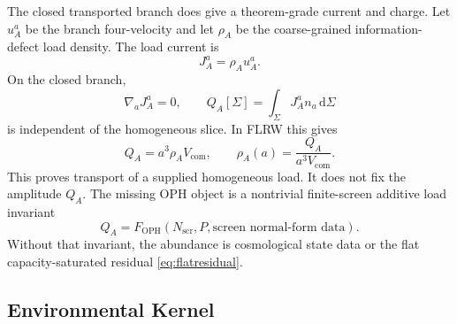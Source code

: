 \documentclass[11pt]{article}
\newcommand{\OPH}{\mathrm{OPH}}
\newcommand{\dd}{\mathrm{d}}
\begin{document}
The closed transported branch does give a theorem-grade current and charge.
Let \(u_A^a\) be the branch four-velocity and let \(\rho_A\) be the
coarse-grained information-defect load density.  The load current is
\begin{equation}
  J_A^a=\rho_A u_A^a .
\end{equation}
On the closed branch,
\begin{equation}
  \nabla_aJ_A^a=0,
  \qquad
  Q_A[\Sigma]=\int_{\Sigma} J_A^a n_a\,\dd\Sigma
\end{equation}
is independent of the homogeneous slice.  In FLRW this gives
\begin{equation}
  Q_A=a^3\rho_A V_{\mathrm{com}},
  \qquad
  \rho_A(a)=\frac{Q_A}{a^3V_{\mathrm{com}}}.
\end{equation}
This proves transport of a supplied homogeneous load.  It does not fix the
amplitude \(Q_A\).  The missing OPH object is a nontrivial finite-screen
additive load invariant
\begin{equation}
  Q_A=
  F_{\OPH}\!\left(
    N_{\mathrm{scr}},P,\text{screen normal-form data}
  \right).
\end{equation}
Without that invariant, the abundance is cosmological state data or the flat
capacity-saturated residual \eqref{eq:flatresidual}.

\subsection{Environmental Kernel}
\end{document}
